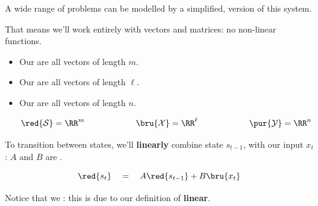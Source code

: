         A wide range of problems can be modelled by a simplified,  version of this system.

        That means we'll work entirely with vectors and matrices: no non-linear functions. 

        \begin{itemize}
            \item Our  are all vectors of length $m$.
            \item Our  are all vectors of length $\ell$.
            \item Our  are all vectors of length $n$.

            \begin{equation}
                \red{\mathcal{S}} = \RR^m    \qquad\qquad\qquad
                \bru{\mathcal{X}} = \RR^\ell \qquad\qquad\qquad
                \pur{\mathcal{Y}} = \RR^n
            \end{equation}
        \end{itemize}

        To transition between states, we'll \textbf{linearly} combine state $s_{t-1}$, with our input $x_t$: $A$ and $B$ are .

        \begin{equation}
            \red{s_{t}} 
            \quad=\quad 
            A\red{s_{t-1}} + B\bru{x_t}
        \end{equation}

        Notice that we : this is due to our definition of \textbf{linear}.\\

